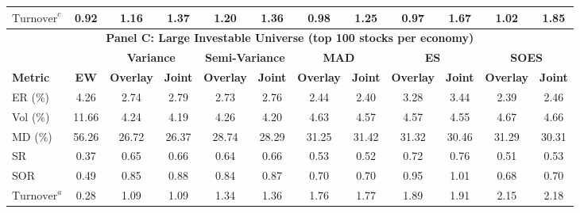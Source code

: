 \begin{table}[tbp]
{\begin{tabular}{l*{11}{c}}
    $\text{Turnover}^c$      & 0.92             & 1.16             & 1.37             & 1.20             & 1.36             & 0.98             & 1.25             & 0.97             & 1.67             & 1.02             & 1.85 \\
    \midrule
    \multicolumn{12}{c}{\textbf{Panel C: Large Investable Universe (top 100 stocks per economy)}} \\
    \midrule
                             &                  & \multicolumn{2}{c}{\textbf{Variance}} & \multicolumn{2}{c}{\textbf{Semi-Variance}} & \multicolumn{2}{c}{\textbf{MAD}} & \multicolumn{2}{c}{\textbf{ES}} & \multicolumn{2}{c}{\textbf{SOES}} \\
    \cmidrule(lr){3-4} \cmidrule(lr){5-6} \cmidrule(lr){7-8} \cmidrule(lr){9-10} \cmidrule(lr){11-12}
    \textbf{Metric}          & \textbf{EW}      & \textbf{Overlay} & \textbf{Joint}   & \textbf{Overlay} & \textbf{Joint}   & \textbf{Overlay} & \textbf{Joint}   & \textbf{Overlay} & \textbf{Joint}   & \textbf{Overlay} & \textbf{Joint} \\
    \midrule
    ER (\%)                  & 4.26             & 2.74             & 2.79             & 2.73             & 2.76             & 2.44             & 2.40             & 3.28             & 3.44             & 2.39             & 2.46 \\
    Vol (\%)                 & 11.66            & 4.24             & 4.19             & 4.26             & 4.20             & 4.63             & 4.57             & 4.57             & 4.55             & 4.67             & 4.66 \\
    MD (\%)                  & 56.26            & 26.72            & 26.37            & 28.74            & 28.29            & 31.25            & 31.42            & 31.32            & 30.46            & 31.29            & 30.31 \\
    SR                       & 0.37             & 0.65             & 0.66             & 0.64             & 0.66             & 0.53             & 0.52             & 0.72             & 0.76             & 0.51             & 0.53 \\
    SOR                      & 0.49             & 0.85             & 0.88             & 0.84             & 0.87             & 0.70             & 0.70             & 0.95             & 1.01             & 0.68             & 0.70 \\
    $\text{Turnover}^a$      & 0.28             & 1.09             & 1.09             & 1.34             & 1.36             & 1.76             & 1.77             & 1.89             & 1.91             & 2.15             & 2.18 \\

\end{tabular}}
\end{table}
